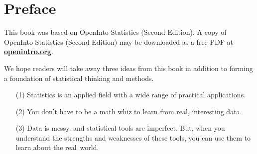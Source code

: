 \chapter*{Preface}

This book was based on OpenInto Statistics (Second Edition). A copy of OpenInto Statistics (Second Edition) may be downloaded as a free PDF at \href{http://www.openintro.org}{\color{black}\textbf{openintro.org}}.
\vspace{3mm}

\noindent We hope readers will take away three ideas from this book in addition to forming a foundation of statistical thinking and methods.\vspace{-1mm}
\begin{enumerate}
\setlength{\itemsep}{0mm}
\item[(1)] Statistics is an applied field with a wide range of practical applications.
\item[(2)] You don't have to be a math whiz to learn from real, interesting data.
\item[(3)] Data is messy, and statistical tools are imperfect. But, when you understand the strengths and weaknesses of these tools, you can use them to learn about the real~world.
\end{enumerate}



